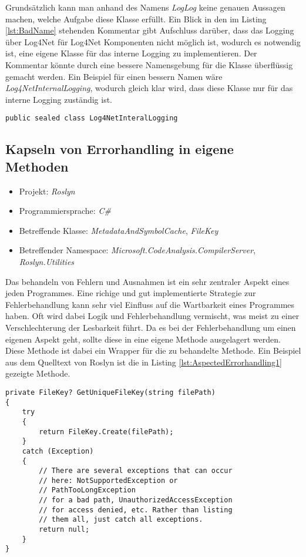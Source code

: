 Grundsätzlich kann man anhand des Namens \textit{LogLog} keine genauen Aussagen machen, welche Aufgabe diese Klasse erfüllt. Ein Blick in den im Listing \ref{lst:BadName} stehenden Kommentar gibt Aufschluss darüber, dass das Logging über Log4Net für Log4Net Komponenten nicht möglich ist, wodurch es notwendig ist, eine eigene Klasse für das interne Logging zu implementieren. Der Kommentar könnte durch eine bessere Namensgebung für die Klasse überflüssig gemacht werden. Ein Beispiel für einen bessern Namen wäre \textit{Log4NetInternalLogging}, wodurch gleich klar wird, dass diese Klasse nur für das interne Logging zuständig ist. 

\begin{lstlisting}[language={[Sharp]C}, caption=Beispiele für bessere Namensgebung, label=lst:GoodName]
	public sealed class Log4NetInteralLogging
\end{lstlisting}

\subsection{Kapseln von Errorhandling in eigene Methoden}
\begin{itemize}
	\item Projekt: \textit{Roslyn}
	\item Programmiersprache: \textit{C\#}
	\item Betreffende Klasse: \textit{MetadataAndSymbolCache}, \textit{FileKey}
	\item Betreffender Namespace: \textit{Microsoft.CodeAnalysis.CompilerServer}, \textit{Roslyn.Utilities}
\end{itemize}

\SuperPar Das behandeln von Fehlern und Ausnahmen ist ein sehr zentraler Aspekt eines jeden Programmes. Eine richige und gut implementierte Strategie zur Fehlerbehandlung kann sehr viel Einfluss auf die Wartbarkeit eines Programmes haben. Oft wird dabei Logik und Fehlerbehandlung vermischt, was meist zu einer Verschlechterung der Lesbarkeit führt. Da es bei der Fehlerbehandlung um einen eigenen Aspekt geht, sollte diese in eine eigene Methode ausgelagert werden. Diese Methode ist dabei ein Wrapper für die zu behandelte Methode. Ein Beispiel aus dem Quelltext von Roslyn ist die in Listing \ref{lst:AspectedErrorhandling1} gezeigte Methode.

\begin{lstlisting}[language={[Sharp]C}, caption=Beispiele für getrennten Aspket der Fehlerbehandlung, label=lst:AspectedErrorhandling1]
private FileKey? GetUniqueFileKey(string filePath)
{
	try
	{
		return FileKey.Create(filePath);
	}
	catch (Exception)
	{
		// There are several exceptions that can occur 
		// here: NotSupportedException or 
		// PathTooLongException
		// for a bad path, UnauthorizedAccessException 
		// for access denied, etc. Rather than listing
		// them all, just catch all exceptions.
		return null;
	}
}
\end{lstlisting}

